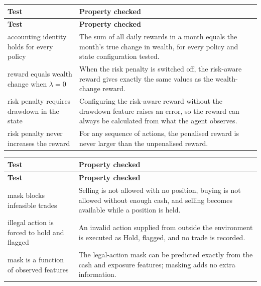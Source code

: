 \begin{longtable}{@{}p{}p{}@{}}
\toprule
\textbf{Test} & \textbf{Property checked} \\
\midrule
\endfirsthead
\toprule
\textbf{Test} & \textbf{Property checked} \\
\midrule
\endhead
\bottomrule
\endlastfoot
accounting identity holds for every policy & The sum of all daily
  rewards in a month equals the month's true change in wealth, for every
  policy and state configuration tested. \\
\rowsep
reward equals wealth change when \(\lambda = 0\) & When the risk penalty
  is switched off, the risk-aware reward gives exactly the same values as
  the wealth-change reward. \\
\rowsep
risk penalty requires drawdown in the state & Configuring the risk-aware
  reward without the drawdown feature raises an error, so the reward can
  always be calculated from what the agent observes. \\
\rowsep
risk penalty never increases the reward & For any sequence of actions,
  the penalised reward is never larger than the unpenalised reward. \\
\end{longtable}


\begin{longtable}{@{}p{}p{}@{}}
\toprule
\textbf{Test} & \textbf{Property checked} \\
\midrule
\endfirsthead
\toprule
\textbf{Test} & \textbf{Property checked} \\
\midrule
\endhead
\bottomrule
\endlastfoot
mask blocks infeasible trades & Selling is not allowed with no position,
  buying is not allowed without enough cash, and selling becomes
  available while a position is held. \\
\rowsep
illegal action is forced to hold and flagged & An invalid action supplied
  from outside the environment is executed as Hold, flagged, and no trade
  is recorded. \\
\rowsep
mask is a function of observed features & The legal-action mask can be
  predicted exactly from the cash and exposure features; masking adds no
  extra information. \\
\end{longtable}

\endgroup
